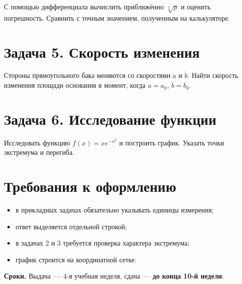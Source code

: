 \documentclass[12pt, a4paper]{article}
\begin{document}
С помощью дифференциала вычислить приближённо $\sqrt[3]{p}$ и оценить
погрешность. Сравнить с точным значением, полученным на калькуляторе.

\section*{Задача 5. Скорость изменения}

Стороны прямоугольного бака меняются со скоростями $\dot a$ и $\dot b$.
Найти скорость изменения площади основания в момент, когда $a = a_0$,
$b = b_0$.

\section*{Задача 6. Исследование функции}

Исследовать функцию $f(x) = x e^{-x^2}$ и построить график.
Указать точки экстремума и перегиба.

\vspace{1.2em}

\section*{Требования к оформлению}

\begin{itemize}[nosep]
  \item в прикладных задачах обязательно указывать единицы измерения;
  \item ответ выделяется отдельной строкой;
  \item в задачах 2 и 3 требуется проверка характера экстремума;
  \item график строится на координатной сетке.
\end{itemize}

\vspace{0.7em}
\noindent\textbf{Сроки.} Выдача~--- 4-я учебная неделя,
сдача~--- \textbf{до конца 10-й недели}.
\end{document}
